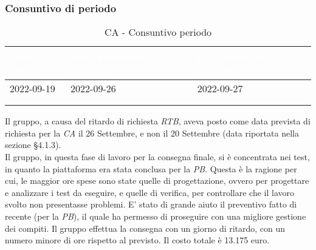             \subsubsection{Consuntivo di periodo} {
                \setlength{\freewidth}{\dimexpr\textwidth-30\tabcolsep}
                \renewcommand{\arraystretch}{1.0}
                \setlength{\aboverulesep}{0pt}
                \setlength{\belowrulesep}{0pt}
                \begin{longtable}{C{.4\freewidth} C{.4\freewidth} C{.4\freewidth}}
                \toprule
                \textcolor{white}{\textbf{Data inizio}}&
                \textcolor{white}{\textbf{Data previsione revisione}}&
                \textcolor{white}{\textbf{Data richiesta revisione}} \\
                \toprule
                \endhead
                    
                2022-09-19 & 2022-09-26 & 2022-09-27 \\
                \\
                \caption{CA - Consuntivo periodo}
                \end{longtable}
            
            Il gruppo, a causa del ritardo di richiesta \textit{RTB}, aveva posto come data prevista di richiesta per la \textit{CA} il 26 Settembre, e non il 20 Settembre (data riportata nella sezione \S 4.1.3). \\
            Il gruppo, in questa fase di lavoro per la consegna finale, si è concentrata nei test, in quanto la piattaforma era stata conclusa per la \textit{PB}. Questa è la ragione per cui, le maggior ore spese sono state 
            quelle di progettazione, ovvero per progettare e analizzare i test da eseguire, e quelle di verifica, per controllare che il lavoro svolto non presentasse problemi. E' stato di grande aiuto il preventivo fatto di recente (per la \textit{PB}), il quale 
            ha permesso di proseguire con una migliore gestione dei compiti. Il gruppo effettua la consegna con un giorno di ritardo, con un numero minore di ore rispetto al previsto. Il costo totale è 13.175 euro. 
    }
